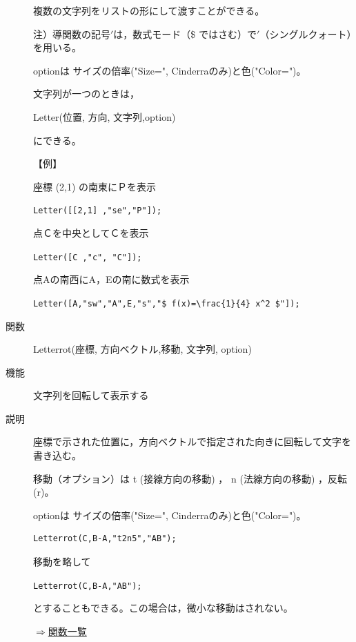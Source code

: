 \documentclass[papersize,a4paper,10pt,uplatex]{jsarticle}
\begin{document}
\begin{description}
複数の文字列をリストの形にして渡すことができる。

注）導関数の記号$'$は，数式モード（\$ ではさむ）で$'$（シングルクォート）を用いる。

optionは サイズの倍率("Size=", Cinderraのみ)と色("Color=")。

文字列が一つのときは，

Letter(位置, 方向, 文字列,option)

にできる。

\vspace{\baselineskip}
【例】

座標 (2,1) の南東にＰを表示

\hspace{10mm}\verb|Letter([[2,1] ,"se","P"]);|

点Ｃを中央としてＣを表示

\hspace{10mm}\verb|Letter([C ,"c", "C"]);|

点Aの南西にA，Eの南に数式を表示

\hspace{10mm}\verb|Letter([A,"sw","A",E,"s","$ f(x)=\frac{1}{4} x^2 $"]);| 

\vspace{\baselineskip}
\hypertarget{letterrot}{}\item[関数]Letterrot(座標, 方向ベクトル,移動, 文字列, option)
\item[機能]文字列を回転して表示する
\item[説明]座標で示された位置に，方向ベクトルで指定された向きに回転して文字を書き込む。

移動（オプション）は t (接線方向の移動) ， n (法線方向の移動) ，反転 (r)。

optionは サイズの倍率("Size=", Cinderraのみ)と色("Color=")。

\begin{verbatim}
Letterrot(C,B-A,"t2n5","AB");
\end{verbatim}

移動を略して

\hspace{10mm}\verb|Letterrot(C,B-A,"AB");|

とすることもできる。この場合は，微小な移動はされない。

\begin{flushright}\hyperlink{functionlist}{$\Rightarrow$関数一覧}\end{flushright}

\end{description}
\end{document}
